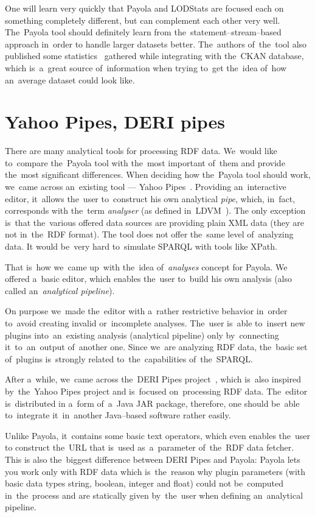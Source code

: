 One will learn very quickly that Payola and LODStats are focused each 
on something completely different, but can complement each other very well. The~Payola 
tool should definitely learn from the~statement--stream--based approach in~order 
to handle larger datasets better. The~authors of~the~tool also published
some statistics~\cite{lodstats} gathered while integrating with the~CKAN database, which is~a~great source of~information when trying to~get the~idea of~how an~average dataset 
could look like. 

\section{Yahoo Pipes, DERI pipes}
There are many analytical tools for processing RDF data. We~would like to~compare the~Payola tool with the~most important of~them and provide the~most significant 
differences. When deciding how the~Payola tool should work, we~came 
across an~existing tool --- Yahoo 
Pipes~\cite{yahoo-pipes}. Providing an~interactive 
editor, it~allows the~user to~construct his own analytical \emph{pipe}, 
which, in~fact, corresponds with the~term \emph{analyser} (as defined in~LDVM~\cite{ldvm}).
The only exception is~that the~various offered data sources are
providing plain XML data (they are not in~the~RDF format).
The tool does not offer the~same level of~analyzing data.
It would be~very hard to~simulate SPARQL with tools like XPath.

That is~how we~came up~with the~idea of~\emph{analyses} concept for Payola. 
We offered a~basic editor, which enables the~user to~build his own analysis
(also called an~\emph{analytical pipeline}).
 
On purpose we~made the~editor with a~rather restrictive behavior in~order to~avoid creating invalid or~incomplete analyses. The~user is~able to~insert new 
plugins into~an~existing analysis (analytical pipeline) only by~connecting it~to~an~output of~another 
one. Since we~are analyzing RDF data, the~basic set of~plugins is~strongly 
related to~the~capabilities of~the~SPARQL.

After a~while, we~came across the~DERI Pipes 
project~\cite{deri-pipes}, which is~also inspired by~the~Yahoo 
Pipes project and is~focused on~processing RDF data. The~editor is~distributed 
in a~form of~a~Java JAR package, therefore, one should be~able to~integrate it~in~another
Java--based software rather easily.

Unlike Payola, it~contains some basic text operators, which even enables the~user  
to construct the~URL that is~used as~a~parameter of~the~RDF data fetcher. This 
is also the~biggest difference between DERI Pipes and Payola: Payola lets 
you work only with RDF data which is~the~reason why plugin parameters (with basic data types string,
boolean, integer and float) could not be~computed in~the~process and are 
statically given by~the~user when defining an~analytical pipeline.

